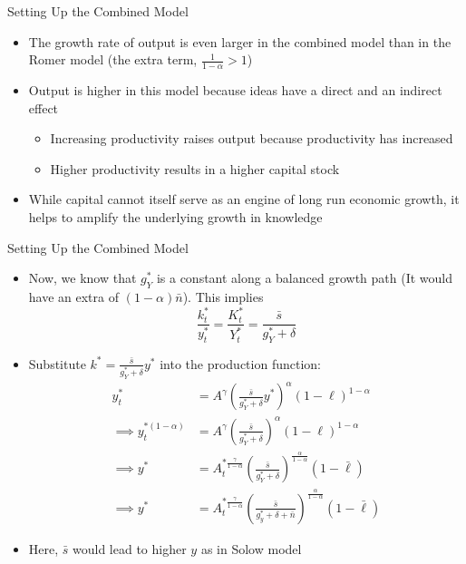 \documentclass[aspectratio=1610]{beamer}
\begin{document}
\begin{frame}[wide]{Setting Up the Combined Model}
	\begin{itemize}
		\item The growth rate of output is even larger in the combined model than in the Romer model (the extra term, $\frac{1}{1-\alpha} > 1$)
		\vspace{1mm}
		\item Output is higher in this model because ideas have a direct and an indirect effect
		\begin{itemize}
			\item Increasing productivity raises output because productivity has increased
			\item Higher productivity results in a higher capital stock
		\end{itemize}
		\vspace{1mm}
		\item While capital cannot itself serve as an engine of long run economic growth, it helps to amplify the underlying growth in knowledge 
	\end{itemize}
\end{frame}

\begin{frame}[wide]{Setting Up the Combined Model}
	\begin{itemize}
		\item Now, we know that $g_Y^*$ is a constant along a balanced growth path (It would have an extra of $(1-\alpha)\bar{n}$). This implies
		\[\frac{k^*_t}{y^*_t} = \frac{K^*_t}{Y^*_t} = \frac{\bar{s}}{g_Y^* + \delta}\]
		\item Substitute $k^* = \frac{\bar{s}}{g_Y^* + \delta} y^*$ into the production function:
		\begin{align*}
			y^*_t &= A^\gamma \left(\frac{\bar{s}}{g_Y^* + \delta} y^*\right)^\alpha (1-\ell)^{1-\alpha} \\
			\implies y^{*(1-\alpha)}_t &= A^\gamma \left(\frac{\bar{s}}{g_Y^* + \delta} \right)^\alpha  (1-\ell)^{1-\alpha} \\
			\implies y^* &= A^{*\frac{\gamma}{1-\alpha}}_t  \left(\frac{\bar{s}}{g_Y^* +\delta }\right)^{\frac{\alpha}{1-\alpha}} (1-\bar{\ell}) \\
			\implies y^* &= A^{*\frac{\gamma}{1-\alpha}}_t  \left(\frac{\bar{s}}{g_y^* +\delta +\bar{n} }\right)^{\frac{\alpha}{1-\alpha}} (1-\bar{\ell})
		\end{align*}
		\item Here, $\bar{s}$ would lead to higher $y$ as in Solow model
	\end{itemize}
\end{frame}
\end{document}
